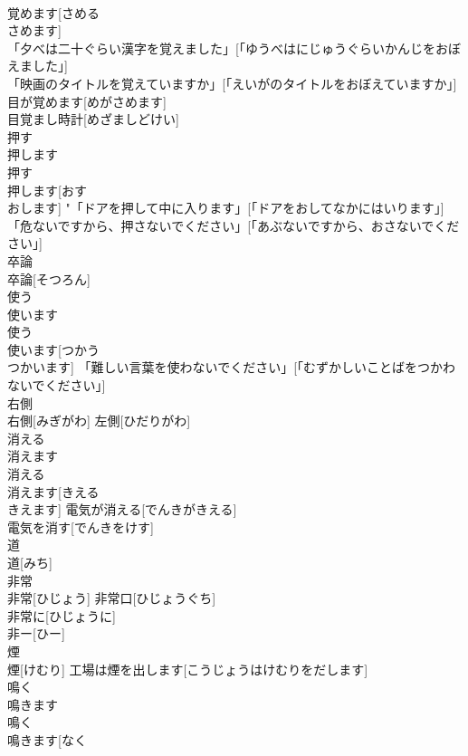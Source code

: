\documentclass[8pt]{extreport}
\begin{document}
\begin{CJK}{UTF8}{min}
\\	覚めます[さめる 
\\	さめます] 
\\	「夕べは二十ぐらい漢字を覚えました」[「ゆうべはにじゅうぐらいかんじをおぼえました」] 
\\	「映画のタイトルを覚えていますか」[「えいがのタイトルをおぼえていますか」] 
\\	目が覚めます[めがさめます] 
\\	目覚まし時計[めざましどけい] 
\\	押す 
\\	押します	
\\	押す 
\\	押します[おす 
\\	おします]	"「ドアを押して中に入ります」[「ドアをおしてなかにはいります」] 
\\	「危ないですから、押さないでください」[「あぶないですから、おさないでください」] 
\\	卒論	
\\	卒論[そつろん]	
\\	使う 
\\	使います	
\\	使う 
\\	使います[つかう 
\\	つかいます]	「難しい言葉を使わないでください」[「むずかしいことばをつかわないでください」] 
\\	右側	
\\	右側[みぎがわ]	左側[ひだりがわ] 
\\	消える 
\\	消えます	
\\	消える 
\\	消えます[きえる 
\\	きえます]	電気が消える[でんきがきえる] 
\\	電気を消す[でんきをけす] 
\\	道	
\\	道[みち]	
\\	非常	
\\	非常[ひじょう]	非常口[ひじょうぐち] 
\\	非常に[ひじょうに] 
\\	非ー[ひー] 
\\	煙	
\\	煙[けむり]	工場は煙を出します[こうじょうはけむりをだします] 
\\	鳴く 
\\	鳴きます	
\\	鳴く 
\\	鳴きます[なく 

\end{CJK}
\end{document}
